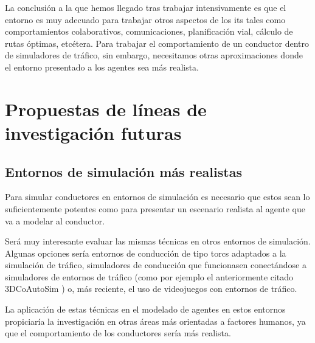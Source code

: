 La conclusión a la que hemos llegado tras trabajar intensivamente es que el entorno es muy adecuado para trabajar otros aspectos de los \acrshort{its} tales como comportamientos colaborativos, comunicaciones, planificación vial, cálculo de rutas óptimas, etcétera. Para trabajar el comportamiento de un conductor dentro de simuladores de tráfico, sin embargo, necesitamos otras aproximaciones donde el entorno presentado a los agentes sea más realista.

\section{Propuestas de líneas de investigación futuras}

\subsection{Entornos de simulación más realistas}

Para simular conductores en entornos de simulación es necesario que estos sean lo suficientemente potentes como para presentar un escenario realista al agente que va a modelar al conductor.

Será muy interesante evaluar las mismas técnicas en otros entornos de simulación. Algunas opciones sería entornos de conducción de tipo \ac{torcs} adaptados a la simulación de tráfico, simuladores de conducción que funcionasen conectándose a simuladores de entornos de tráfico (como por ejemplo el anteriormente citado 3DCoAutoSim \cite{olaverri2018implementation}) o, más reciente, el uso de videojuegos con entornos de tráfico.

La aplicación de estas técnicas en el modelado de agentes en estos entornos propiciaría la investigación en otras áreas más orientadas a factores humanos, ya que el comportamiento de los conductores sería más realista.

